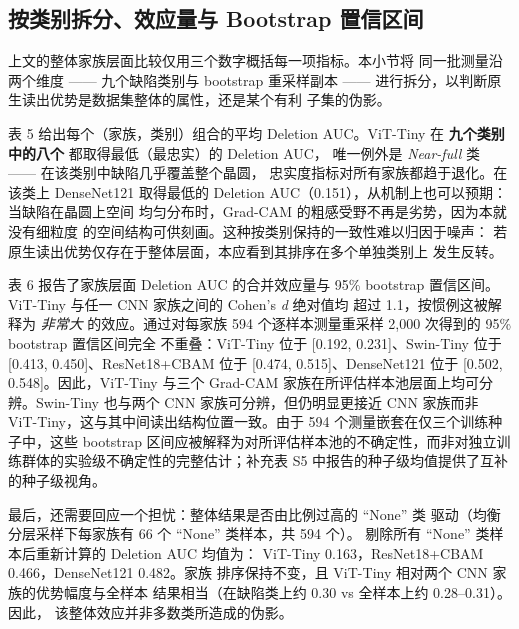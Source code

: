 \documentclass[11pt,a4paper]{article}
\begin{document}
\subsection{按类别拆分、效应量与 Bootstrap 置信区间}

上文的整体家族层面比较仅用三个数字概括每一项指标。本小节将 同一批测量沿两个维度 —— 九个缺陷类别与 bootstrap 重采样副本 —— 进行拆分，以判断原生读出优势是数据集整体的属性，还是某个有利 子集的伪影。

表 5 给出每个（家族，类别）组合的平均 Deletion AUC。ViT-Tiny 在 \textbf{九个类别中的八个} 都取得最低（最忠实）的 Deletion AUC， 唯一例外是 \emph{Near-full} 类 —— 在该类别中缺陷几乎覆盖整个晶圆， 忠实度指标对所有家族都趋于退化。在该类上 DenseNet121 取得最低的 Deletion AUC（0.151），从机制上也可以预期：当缺陷在晶圆上空间 均匀分布时，Grad-CAM 的粗感受野不再是劣势，因为本就没有细粒度 的空间结构可供刻画。这种按类别保持的一致性难以归因于噪声： 若原生读出优势仅存在于整体层面，本应看到其排序在多个单独类别上 发生反转。

表 6 报告了家族层面 Deletion AUC 的合并效应量与 95\% bootstrap 置信区间。ViT-Tiny 与任一 CNN 家族之间的 Cohen's \emph{d} 绝对值均 超过 1.1，按惯例这被解释为 \emph{非常大} 的效应。通过对每家族 594 个逐样本测量重采样 2,000 次得到的 95\% bootstrap 置信区间完全 不重叠：ViT-Tiny 位于 [0.192, 0.231]、Swin-Tiny 位于 [0.413, 0.450]、ResNet18+CBAM 位于 [0.474, 0.515]、DenseNet121 位于 [0.502, 0.548]。因此，ViT-Tiny 与三个 Grad-CAM 家族在所评估样本池层面上均可分辨。Swin-Tiny 也与两个 CNN 家族可分辨，但仍明显更接近 CNN 家族而非 ViT-Tiny，这与其中间读出结构位置一致。由于 594 个测量嵌套在仅三个训练种子中，这些 bootstrap 区间应被解释为对所评估样本池的不确定性，而非对独立训练群体的实验级不确定性的完整估计；补充表 S5 中报告的种子级均值提供了互补的种子级视角。

最后，还需要回应一个担忧：整体结果是否由比例过高的 “None” 类 驱动（均衡分层采样下每家族有 66 个 “None” 类样本，共 594 个）。 剔除所有 “None” 类样本后重新计算的 Deletion AUC 均值为： ViT-Tiny 0.163，ResNet18+CBAM 0.466，DenseNet121 0.482。家族 排序保持不变，且 ViT-Tiny 相对两个 CNN 家族的优势幅度与全样本 结果相当（在缺陷类上约 0.30 vs 全样本上约 0.28–0.31）。因此， 该整体效应并非多数类所造成的伪影。


\begin{table}[htbp]
\centering
\small
\caption{\textbf{表 5.} 各类别 Deletion AUC（越低越忠实）。ViT-Tiny 在 9 个类别中的 8 个上最为忠实}
\end{table}
\end{document}
